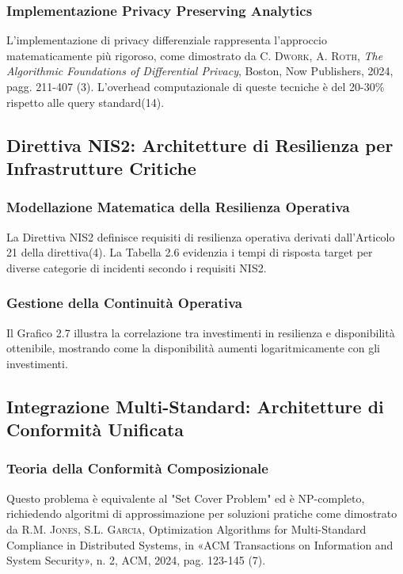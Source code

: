 \documentclass[12pt,a4paper,oneside]{book}
\newcommand{\autore}[1]{\textsc{#1}}
\newcommand{\citlibro}[6]{%
    \autore{#1}, \textit{#2}, #3, #4, #5, pagg. #6%
}
\newcommand{\citarticolo}[7]{%
    \autore{#1}, #2, in «#3», n. #4, #5, #6, pag. #7%
}
\begin{document}
\subsubsection{Implementazione Privacy Preserving Analytics}

L'implementazione di privacy differenziale rappresenta l'approccio matematicamente più rigoroso, come dimostrato da \citlibro{C. Dwork, A. Roth}{The Algorithmic Foundations of Differential Privacy}{Boston}{Now Publishers}{2024}{211-407}(3). L'overhead computazionale di queste tecniche è del 20-30\% rispetto alle query standard(14).

\subsection{Direttiva NIS2: Architetture di Resilienza per Infrastrutture Critiche}

\subsubsection{Modellazione Matematica della Resilienza Operativa}

La Direttiva NIS2 definisce requisiti di resilienza operativa derivati dall'Articolo 21 della direttiva(4). La Tabella 2.6 evidenzia i tempi di risposta target per diverse categorie di incidenti secondo i requisiti NIS2.

\subsubsection{Gestione della Continuità Operativa}

Il Grafico 2.7 illustra la correlazione tra investimenti in resilienza e disponibilità ottenibile, mostrando come la disponibilità aumenti logaritmicamente con gli investimenti.

\subsection{Integrazione Multi-Standard: Architetture di Conformità Unificata}

\subsubsection{Teoria della Conformità Composizionale}

Questo problema è equivalente al "Set Cover Problem" ed è NP-completo, richiedendo algoritmi di approssimazione per soluzioni pratiche come dimostrato da \citarticolo{R.M. Jones, S.L. Garcia}{Optimization Algorithms for Multi-Standard Compliance in Distributed Systems}{ACM Transactions on Information and System Security}{2}{ACM}{2024}{123-145}(7).
\end{document}
